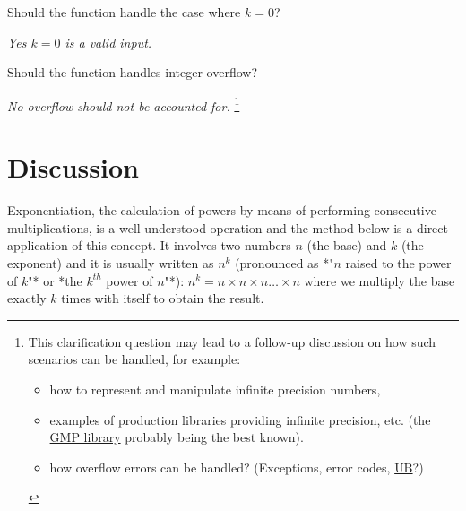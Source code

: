 \begin{QandA}
    \item \begin{questionitem} \begin{question} Should the function handle the case where $k=0$?  \end{question}      
    \begin{answered}
        \textit{Yes $k=0$ is a valid input.}
    \end{answered} \end{questionitem}
    
    \item \begin{questionitem} \begin{question} Should the function handles integer overflow?  \end{question}      
    \begin{answered}
        \textit{No overflow should not be accounted for. }\footnote{
            This clarification question may lead to a follow-up discussion on how such scenarios can be handled, for example: 
            \begin{itemize}
                \item how to represent and manipulate infinite precision numbers,
                \item examples of production libraries providing infinite precision, etc. (the \href{https://gmplib.org/}{GMP library}\cite{cit::web::gmplibrary} probably being the best known).
                \item how overflow errors can be handled? (Exceptions, error codes, \href{https://en.cppreference.com/w/cpp/language/ub}{UB}\cite{cit::std::ub}?)
            \end{itemize}
            }
    \end{answered} \end{questionitem}
        
\end{QandA}

\section{Discussion}
\label{exponentiation:sec:discussion}

Exponentiation, the calculation of powers by means of performing consecutive multiplications, is a well-understood operation and the method below is a direct application of this concept.  
It involves two numbers $n$ (the base) and $k$ (the exponent) and it is usually written as $n^k$ (pronounced as *"$n$ raised to the power of $k$"* or *the ${k^{th}}$ power of $n$"*):
$n^k = n \times n \times n \ldots  \times n$ where we multiply the base exactly $k$ times with itself
to obtain the result. 

